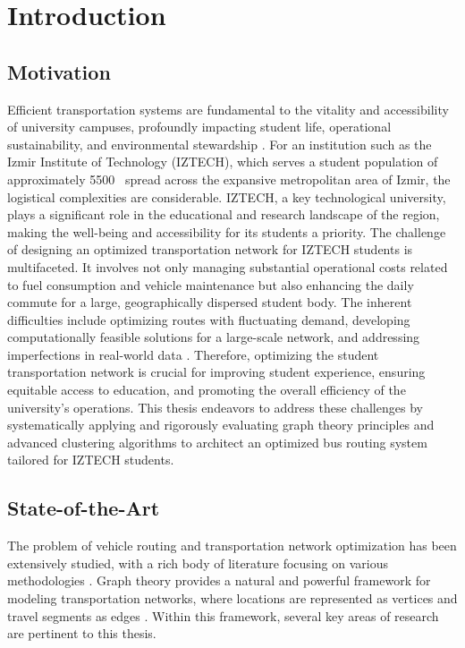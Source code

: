 \chapter{Introduction}
\label{ch:introduction}

\section{Motivation}
\label{sec:intro_motivation}
Efficient transportation systems are fundamental to the vitality and accessibility of university campuses, profoundly impacting student life, operational sustainability, and environmental stewardship \cite{dell2016campus, guido2017sustainable}. For an institution such as the Izmir Institute of Technology (IZTECH), which serves a student population of approximately 5500~\cite{iztech_info} spread across the expansive metropolitan area of Izmir, the logistical complexities are considerable. IZTECH, a key technological university, plays a significant role in the educational and research landscape of the region, making the well-being and accessibility for its students a priority. The challenge of designing an optimized transportation network for IZTECH students is multifaceted. It involves not only managing substantial operational costs related to fuel consumption and vehicle maintenance but also enhancing the daily commute for a large, geographically dispersed student body. The inherent difficulties include optimizing routes with fluctuating demand, developing computationally feasible solutions for a large-scale network, and addressing imperfections in real-world data \cite{kaviani2019smart, saberi2017models}. Therefore, optimizing the student transportation network is crucial for improving student experience, ensuring equitable access to education, and promoting the overall efficiency of the university's operations. This thesis endeavors to address these challenges by systematically applying and rigorously evaluating graph theory principles and advanced clustering algorithms to architect an optimized bus routing system tailored for IZTECH students.

\section{State-of-the-Art}
\label{sec:intro_sota}
The problem of vehicle routing and transportation network optimization has been extensively studied, with a rich body of literature focusing on various methodologies \cite{toth2014vehicle}. Graph theory provides a natural and powerful framework for modeling transportation networks, where locations are represented as vertices and travel segments as edges \cite{tarapata2019graph}. Within this framework, several key areas of research are pertinent to this thesis.

